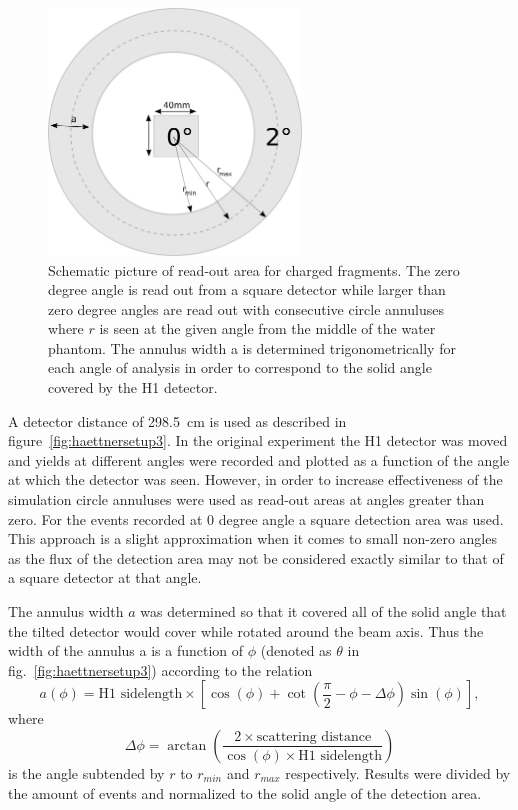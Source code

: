 \begin{figure}[!h] 
\begin{center}
\includegraphics[width=0.6\textwidth]{images/annulus.png}  
\caption{\label{fig:annulusesExplained} Schematic picture of read-out area for charged fragments. The zero degree angle is read out from a square detector while larger than zero degree angles are read out with consecutive circle annuluses where $r$ is seen at the given angle from the middle of the water phantom. The annulus width a is determined trigonometrically for each angle of analysis in order to correspond to the solid angle covered by the H1 detector.}
\end{center}
\end{figure}

A detector distance of 298.5~cm is used as described in figure~\ref{fig:haettnersetup3}. In the original experiment the H1 detector was moved and yields at different angles were recorded and plotted as a function of the angle at which the detector was seen. However, in order to increase effectiveness of the simulation circle annuluses were used as read-out areas at angles greater than zero. For the events recorded at 0 degree angle a square detection area was used. This approach is a slight approximation when it comes to small non-zero angles as the flux of the detection area may not be considered exactly similar to that of a square detector at that angle.

The annulus width $a$ was determined so that it covered all of the solid angle that the tilted detector would cover while rotated around the beam axis. Thus the width of the annulus a is a function of $\phi$ (denoted as $\theta$ in fig.~\ref{fig:haettnersetup3}) according to the relation \begin{equation}a(\phi) = \text{H1 sidelength} \times [\cos(\phi)+ \cot(\frac{\pi}{2} - \phi - \Delta\phi)\sin(\phi)],\end{equation}where \begin{equation}\Delta\phi = \arctan(\frac{2 \times \text{scattering distance}}{\cos(\phi) \times \text{H1 sidelength}})\end{equation} is the angle subtended by $r$ to $r_{min}$ and $r_{max}$ respectively.
Results were divided by the amount of events and normalized to the solid angle of the detection area.

